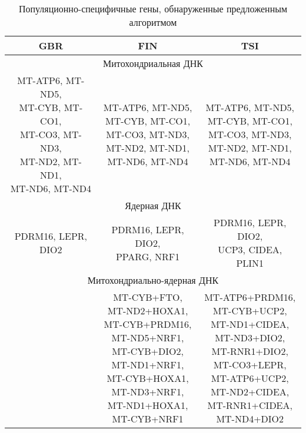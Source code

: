 \begin{table} [htbp]
	\centering
	\begin{threeparttable}
		\caption{Популяционно-специфичные гены, обнаруженные предложенным алгоритмом}%
		\label{tab:pop_specific_synopsis}%
		\begin{SingleSpace}
			\begin{tabular}{| c | c | c |}
				\hline
				GBR & FIN & TSI \\ \hline
				\multicolumn{3}{|c|}{Митохондриальная ДНК}\\ \hline
				\thead{MT-ATP6, MT-ND5, \\ MT-CYB, MT-CO1, \\ MT-CO3, MT-ND3, \\ MT-ND2, MT-ND1, \\ MT-ND6, MT-ND4}& \thead{MT-ATP6, MT-ND5, \\ MT-CYB, MT-CO1, \\ MT-CO3, MT-ND3, \\ MT-ND2, MT-ND1, \\ MT-ND6, MT-ND4} & \thead{MT-ATP6, MT-ND5, \\ MT-CYB, MT-CO1, \\ MT-CO3, MT-ND3, \\ MT-ND2, MT-ND1, \\ MT-ND6, MT-ND4}\\ \hline
				\multicolumn{3}{|c|}{Ядерная ДНК}\\ \hline
				PDRM16, LEPR, DIO2 & \thead{PDRM16, LEPR, DIO2, \\ PPARG, NRF1} & \thead{PDRM16, LEPR, DIO2, \\ UCP3, CIDEA, PLIN1} \\ \hline
				\multicolumn{3}{|c|}{Митохондриально-ядерная ДНК}\\ \hline
				& \thead{MT-CYB+FTO, \\ MT-ND2+HOXA1, \\ MT-CYB+PRDM16, \\ MT-ND5+NRF1, \\ MT-CYB+DIO2, \\ MT-ND1+NRF1, \\ MT-CYB+HOXA1, \\ MT-ND3+NRF1, \\ MT-ND1+HOXA1, \\ MT-CYB+NRF1}& \thead{MT-ATP6+PRDM16, \\ MT-CYB+UCP2, \\ MT-ND1+CIDEA, \\ MT-ND3+DIO2, \\ MT-RNR1+DIO2, \\ MT-CO3+LEPR, \\ MT-ATP6+UCP2, \\ MT-ND2+CIDEA, \\ MT-RNR1+CIDEA, \\ MT-ND4+DIO2}\\ \hline
			\end{tabular}%
		\end{SingleSpace}
	\end{threeparttable}
\end{table}


